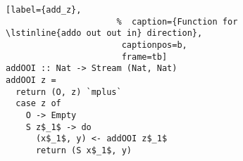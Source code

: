 \begin{figure}[!t]
  \centering
  \begin{minipage}{\columnwidth}
    \begin{lstlisting}[label={add_z},
                      %  caption={Function for \lstinline{addo out out in} direction},
                       captionpos=b,
                       frame=tb]
addOOI :: Nat -> Stream (Nat, Nat)
addOOI z =
  return (O, z) `mplus`
  case z of
    O -> Empty
    S z$_1$ -> do
      (x$_1$, y) <- addOOI z$_1$
      return (S x$_1$, y)
    \end{lstlisting}
  \end{minipage}
\end{figure}